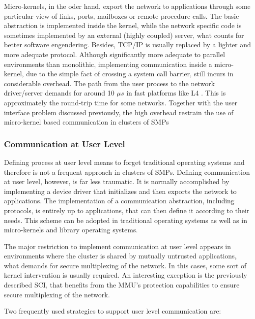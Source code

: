 	Micro-kernels, in the oder hand, export the network to applications through some particular view of links, ports, mailboxes or remote procedure calls. The basic abstraction is implemented inside the kernel, while the network specific code is sometimes implemented by an external (highly coupled) server, what counts for better software engendering. Besides, TCP/IP is usually replaced by a lighter and more adequate protocol. Although significantly more adequate to parallel environments than monolithic, implementing communication inside a micro-kernel, due to the simple fact of crossing a system call barrier, still incurs in considerable overhead. The path from the user process to the network driver/server demands for around 10 $\mu s$ in fast platforms like L4 \cite{Liedtke:95}. This is approximately the round-trip time for some networks. Together with the user interface problem discussed previously, the high overhead restrain the use of micro-kernel based communication in clusters of SMPs	
	

\subsubsection{\label{soft_comm_user}Communication at User Level}

	Defining process at user level means to forget traditional operating systems and therefore is not a frequent approach in clusters of SMPs. Defining communication at user level, however, is far less traumatic. It is normally accomplished by implementing a device driver that initializes and then exports the network to applications. The implementation of a communication abstraction, including protocols, is entirely up to applications, that can then define it according to their needs. This scheme can be adopted in traditional operating systems as well as in micro-kernels and library operating systems.
	
	The major restriction to implement communication at user level appears in environments where the cluster is shared by mutually untrusted applications, what demands for secure multiplexing of the network. In this cases, some sort of kernel intervention is usually required. An interesting exception is the previously described SCI, that benefits from the MMU's protection capabilities to ensure secure multiplexing of the network.

	Two frequently used strategies to support user level communication are:
	
